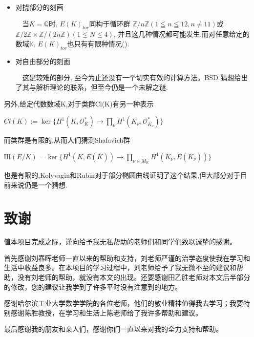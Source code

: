 \documentclass[11pt]{ctexart}
\begin{document}
\begin{itemize}
    \item 对挠部分的刻画

    ~~当$K=\mathbb{Q}$时, $E(K)_{tor}$同构于循环群 $\mathbb{Z}/n\mathbb{Z} (1\leqq n \leqq 12, n \neq 11) $或 $\mathbb{Z}/2\mathbb{Z} \times  \mathbb{Z}/(2n\mathbb{Z}) (1\leq  N\leq 4)$, 并且这几种情况都可能发生.而对任意给定的数域$\mathbb{K}$, $E(K)_{tor}$也只有有限种情况(\cite{Merel}).

    \item 对自由部分的刻画
    
    ~~这是较难的部分, 至今为止还没有一个切实有效的计算方法。BSD 猜想给出了其与解析理论的联系，但至今仍是一个未解之谜.

\end{itemize}
另外,给定代数数域K,对于类群Cl(K)有另一种表示
\begin{center}
   $ Cl(K):=\ker\{H^{1}(K,\mathcal{O}_K^{*})\rightarrow \prod\limits_{\nu}H^{1}(K_{\nu},\mathcal{O}_{\bar{K_{\nu}}}^{*}) \}$
\end{center}
而类群是有限的,从而人们猜测Shafavich群
\begin{center}
    \textup{Ш}$(E/K)=\ker\{H^1(K,E({\overline{K}}))\rightarrow \prod\limits_{\nu \in M_K}H^1(K_{\nu},E(\overline{K}_{\nu})) \}$
\end{center}
也是有限的,Kolyvagin\cite{Kolyvagin}和Rubin\cite{Rubin}对于部分椭圆曲线证明了这个结果,但大部分对于目前来说仍是一个猜想. 

\section{致谢}
值本项目完成之际，谨向给予我无私帮助的老师们和同学们致以诚挚的感谢。

首先感谢刘春晖老师一直以来的帮助和支持，刘老师严谨的治学态度使我在学习和生活中收益良多。在本项目的学习过程中，刘老师给予了我无微不至的建议和帮助，没有刘老师的帮助，就没有本文的出现。还要感谢田乙胜老师对本文后半部分的修改，您的建议让我学到了许多平时没有注意到的地方。

感谢哈尔滨工业大学数学学院的各位老师，他们的敬业精神值得我去学习；我要特别感谢陈胜教授，在学习和生活上陈老师给了我许多帮助和建议。

最后感谢我的朋友和亲人们，感谢你们一直以来对我的全力支持和帮助。
\end{document}
